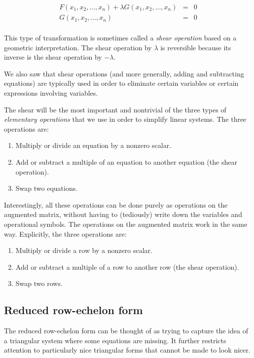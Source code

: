 \documentclass[10pt]{amsart}
\begin{document}
\begin{eqnarray*}
  F(x_1,x_2,\dots,x_n) + \lambda G(x_1,x_2,\dots,x_n) & = & 0\\
  G(x_1,x_2,\dots,x_n) & = & 0\\
\end{eqnarray*}

This type of transformation is sometimes called a {\em shear
  operation} based on a geometric interpretation. The shear operation
by $\lambda$ is reversible because its inverse is the shear operation
by $-\lambda$.

We also saw that shear operations (and more generally, adding and
subtracting equations) are typically used in order to eliminate
certain variables or certain expressions involving variables.

The shear will be the most important and nontrivial of the three types
of {\em elementary operations} that we use in order to simplify linear
systems. The three operations are:

\begin{enumerate}
\item Multiply or divide an equation by a nonzero scalar.
\item Add or subtract a multiple of an equation to another equation
  (the shear operation).
\item Swap two equations.
\end{enumerate}

Interestingly, all these operations can be done purely as operations
on the augmented matrix, without having to (tediously) write down the
variables and operational symbols. The operations on the augmented
matrix work in the same way. Explicitly, the three operations are:

\begin{enumerate}
\item Multiply or divide a row by a nonzero scalar.
\item Add or subtract a multiple of a row to another row (the shear operation).
\item Swap two rows.
\end{enumerate}

\subsection{Reduced row-echelon form}

The reduced row-echelon form can be thought of as trying to capture
the idea of a triangular system where some equations are missing. It
further restricts attention to particularly nice triangular forms that
cannot be made to look nicer.
\end{document}
